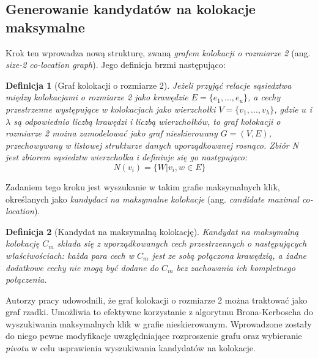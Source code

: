 \documentclass[12pt]{article}
\newtheorem{defin}{Definicja}
\begin{document}
\subsection{Generowanie kandydatów na kolokacje maksymalne}

Krok ten wprowadza nową strukturę, zwaną \textit{grafem kolokacji o rozmiarze 2} (ang. \textit{size-2 co-location graph}). Jego definicja brzmi następująco:

\begin{defin}[Graf kolokacji o rozmiarze 2]
Jeżeli przyjąć relacje sąsiedztwa między kolokacjami o rozmiarze 2 jako krawędzie $ E = \{e_{1},...,e_{u}\}$, a cechy przestrzenne występujące w kolokacjach jako wierzchołki $ V = \{v_{1},...,v_{\lambda}\}$, gdzie $ u $ i $ \lambda $ są odpowiednio liczbą krawędzi i liczbą wierzchołków, to graf kolokacji o rozmiarze 2 można zamodelować jako graf nieskierowany $ G= (V, E)$, przechowywany w listowej strukturze danych uporządkowanej rosnąco. Zbiór N jest zbiorem sąsiedztw wierzchołka i definiuje się go następująco:
\begin{equation}
N(v_{i}) = \{W|{v_{i},w} \in E\}
\end{equation}
\end{defin}

Zadaniem tego kroku jest wyszukanie w takim grafie maksymalnych klik, określanych jako \textit{kandydaci na maksymalne kolokacje} (ang. \textit{candidate maximal co-location}).

\begin{defin}[Kandydat na maksymalną kolokację]
Kandydat na maksymalną kolokację $ C_{m} $ składa się z uporządkowanych cech przestrzennych o następujących właściwościach: każda para cech w  $ C_{m} $  jest ze sobą połączona krawędzią, a żadne dodatkowe cechy nie mogą być dodane do $ C_{m} $ bez zachowania ich kompletnego połączenia.
\end{defin}

Autorzy pracy \cite{chinczyki} udowodnili, że graf kolokacji o rozmiarze 2 można traktować jako graf rzadki. Umożliwia to efektywne korzystanie z algorytmu Brona-Kerboscha \cite{kerbosz} do wyszukiwania maksymalnych klik w grafie nieskierowanym. Wprowadzone zostały do niego pewne modyfikacje uwzględniające rozproszenie grafu oraz wybieranie \textit{pivotu} w celu usprawienia wyszukiwania kandydatów na kolokacje. 
\end{document}
